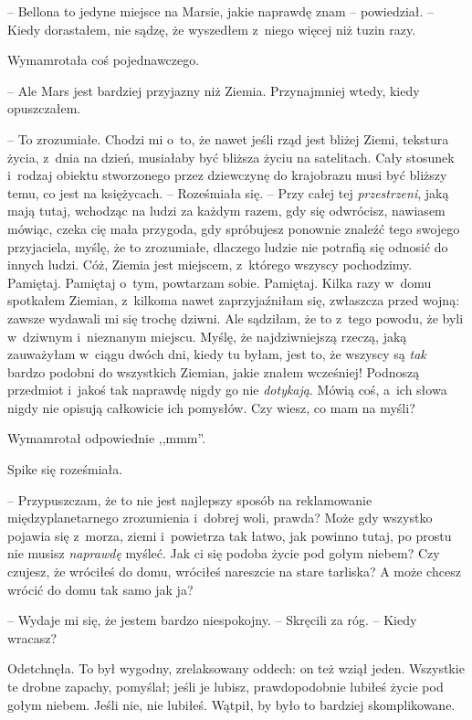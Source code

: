 \documentclass[oneside,polish,11pt,rmheadings]{mwbk}
\begin{document}
-- Bellona to jedyne miejsce na Marsie, jakie naprawdę znam -- powiedział. -- Kiedy dorastałem, nie sądzę, że wyszedłem z~niego więcej niż tuzin razy. 

Wymamrotała coś pojednawczego. 

-- Ale Mars jest bardziej przyjazny niż Ziemia. Przynajmniej wtedy, kiedy opuszczałem. 

-- To zrozumiałe. Chodzi mi o~to, że nawet jeśli rząd jest bliżej Ziemi, tekstura życia, z~dnia na dzień, musiałaby być bliższa życiu na satelitach. Cały stosunek i~rodzaj obiektu stworzonego przez dziewczynę do krajobrazu musi być bliższy temu, co jest na księżycach. -- Roześmiała się. -- Przy całej tej \textit{przestrzeni}, jaką mają tutaj, wchodząc na ludzi za każdym razem, gdy się odwrócisz, nawiasem mówiąc, czeka cię mała przygoda, gdy spróbujesz ponownie znaleźć tego swojego przyjaciela, myślę, że to zrozumiałe, dlaczego ludzie nie potrafią się odnosić do innych ludzi. Cóż, Ziemia jest miejscem, z~którego wszyscy pochodzimy. Pamiętaj. Pamiętaj o~tym, powtarzam sobie. Pamiętaj. Kilka razy w~domu spotkałem Ziemian, z~kilkoma nawet zaprzyjaźniłam się, zwłaszcza przed wojną: zawsze wydawali mi się trochę dziwni. Ale sądziłam, że to z~tego powodu, że byli w~dziwnym i~nieznanym miejscu. Myślę, że najdziwniejszą rzeczą, jaką zauważyłam w~ciągu dwóch dni, kiedy tu byłam, jest to, że wszyscy są \textit{tak }bardzo podobni do wszystkich Ziemian, jakie znałem wcześniej! Podnoszą przedmiot i~jakoś tak naprawdę nigdy go nie \textit{dotykają}. Mówią coś, a~ich słowa nigdy nie opisują całkowicie ich pomysłów. Czy wiesz, co mam na myśli? 

Wymamrotał odpowiednie ,,mmm''.

Spike się roześmiała. 

-- Przypuszczam, że to nie jest najlepszy sposób na reklamowanie międzyplanetarnego zrozumienia i~dobrej woli, prawda? Może gdy wszystko pojawia się z~morza, ziemi i~powietrza tak łatwo, jak powinno tutaj, po prostu nie musisz \textit{naprawdę }myśleć. Jak ci się podoba życie pod gołym niebem? Czy czujesz, że wróciłeś do domu, wróciłeś nareszcie na stare tarliska? A może chcesz wrócić do domu tak samo jak ja? 

-- Wydaje mi się, że jestem bardzo niespokojny. -- Skręcili za róg. -- Kiedy wracasz? 

Odetchnęła. To był wygodny, zrelaksowany oddech: on też wziął jeden. Wszystkie te drobne zapachy, pomyślał; jeśli je lubisz, prawdopodobnie lubiłeś życie pod gołym niebem. Jeśli nie, nie lubiłeś. Wątpił, by było to bardziej skomplikowane. 
\end{document}
